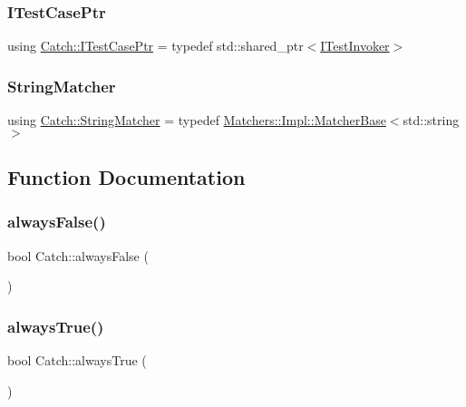 \subsubsection{\texorpdfstring{I\+Test\+Case\+Ptr}{ITestCasePtr}}
{\footnotesize\ttfamily using \mbox{\hyperlink{namespaceCatch_afa04ebe8e9423240c9585f7101a82ddf}{Catch\+::\+I\+Test\+Case\+Ptr}} = typedef std\+::shared\+\_\+ptr$<$\mbox{\hyperlink{structCatch_1_1ITestInvoker}{I\+Test\+Invoker}}$>$}

\mbox{\label{namespaceCatch_aba438977e831821a2eeca82b9b4f4af2}} 
\subsubsection{\texorpdfstring{String\+Matcher}{StringMatcher}}
{\footnotesize\ttfamily using \mbox{\hyperlink{namespaceCatch_aba438977e831821a2eeca82b9b4f4af2}{Catch\+::\+String\+Matcher}} = typedef \mbox{\hyperlink{structCatch_1_1Matchers_1_1Impl_1_1MatcherBase}{Matchers\+::\+Impl\+::\+Matcher\+Base}}$<$std\+::string$>$}



\subsection{Function Documentation}
\mbox{\label{namespaceCatch_ad425271249dd02956a9709e78b8b2783}} 
\subsubsection{\texorpdfstring{always\+False()}{alwaysFalse()}}
{\footnotesize\ttfamily bool Catch\+::always\+False (\begin{DoxyParamCaption}{ }\end{DoxyParamCaption})}

\mbox{\label{namespaceCatch_a129be2186a2f6546206ec52c4bf2156f}} 
\subsubsection{\texorpdfstring{always\+True()}{alwaysTrue()}}
{\footnotesize\ttfamily bool Catch\+::always\+True (\begin{DoxyParamCaption}{ }\end{DoxyParamCaption})}

